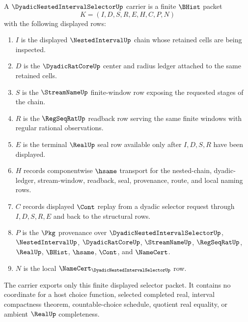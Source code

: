 \begin{definition}
\label{def:dyadic-nested-interval-selector-carrier}
A $\DyadicNestedIntervalSelectorUp$ carrier is a finite $\BHist$ packet
$$
K=(I,D,S,R,E,H,C,P,N)
$$
with the following displayed rows:
\begin{enumerate}
\item $I$ is the displayed $\NestedIntervalUp$ chain whose retained cells are being inspected.
\item $D$ is the $\DyadicRatCoreUp$ center and radius ledger attached to the same retained cells.
\item $S$ is the $\StreamNameUp$ finite-window row exposing the requested stages of the chain.
\item $R$ is the $\RegSeqRatUp$ readback row serving the same finite windows with regular rational observations.
\item $E$ is the terminal $\RealUp$ seal row available only after $I,D,S,R$ have been displayed.
\item $H$ records componentwise $\hsame$ transport for the nested-chain, dyadic-ledger, stream-window, readback, seal, provenance, route, and local naming rows.
\item $C$ records displayed $\Cont$ replay from a dyadic selector request through $I,D,S,R,E$ and back to the structural rows.
\item $P$ is the $\Pkg$ provenance over $\DyadicNestedIntervalSelectorUp$, $\NestedIntervalUp$, $\DyadicRatCoreUp$, $\StreamNameUp$, $\RegSeqRatUp$, $\RealUp$, $\BHist$, $\hsame$, $\Cont$, and $\NameCert$.
\item $N$ is the local $\NameCert_{\DyadicNestedIntervalSelectorUp}$ row.
\end{enumerate}
The carrier exports only this finite displayed selector packet. It contains no coordinate for a host choice function, selected completed real, interval compactness theorem, countable-choice schedule, quotient real equality, or ambient $\RealUp$ completeness.
\end{definition}

